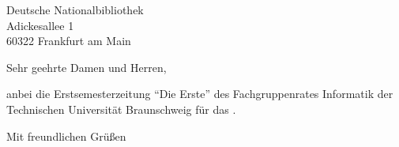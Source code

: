 \documentclass[%
  nexus,%
  mono,%
  10pt%
]{tubslttr2}
\begin{document}
\begin{letter}{%
  Deutsche Nationalbibliothek\\
  Adickesallee 1\\
  60322 Frankfurt am Main
}
\opening{Sehr geehrte Damen und Herren,}

anbei die Erstsemesterzeitung \enquote{Die Erste} des Fachgruppenrates Informatik der Technischen Universität Braunschweig für das \iftoggle{winter}{Wintersemester}{Sommersemester} \the\year.

\closing{Mit freundlichen Grüßen}

\end{letter}
\end{document}
